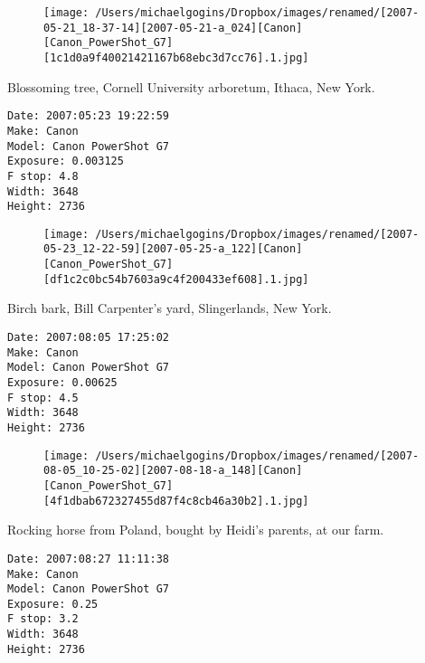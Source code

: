 \documentclass[11pt,letter,DIV=14,paper=landscape]{scrbook}
\begin{document}
\begin{figure}
\texttt{[image: /Users/michaelgogins/Dropbox/images/renamed/[2007-05-21\_18-37-14][2007-05-21-a\_024][Canon][Canon\_PowerShot\_G7][1c1d0a9f40021421167b68ebc3d7cc76].1.jpg]}
\end{figure}
    
\clearpage
\noindent Blossoming tree, Cornell University arboretum, Ithaca, New York.
\noindent
\begin{lstlisting}
Date: 2007:05:23 19:22:59
Make: Canon
Model: Canon PowerShot G7
Exposure: 0.003125
F stop: 4.8
Width: 3648
Height: 2736
\end{lstlisting}
\clearpage

\begin{figure}
\texttt{[image: /Users/michaelgogins/Dropbox/images/renamed/[2007-05-23\_12-22-59][2007-05-25-a\_122][Canon][Canon\_PowerShot\_G7][df1c2c0bc54b7603a9c4f200433ef608].1.jpg]}
\end{figure}
    
\clearpage
\noindent Birch bark, Bill Carpenter's yard, Slingerlands, New York.
\noindent
\begin{lstlisting}
Date: 2007:08:05 17:25:02
Make: Canon
Model: Canon PowerShot G7
Exposure: 0.00625
F stop: 4.5
Width: 3648
Height: 2736
\end{lstlisting}
\clearpage

\begin{figure}
\texttt{[image: /Users/michaelgogins/Dropbox/images/renamed/[2007-08-05\_10-25-02][2007-08-18-a\_148][Canon][Canon\_PowerShot\_G7][4f1dbab672327455d87f4c8cb46a30b2].1.jpg]}
\end{figure}
    
\clearpage
\noindent Rocking horse from Poland, bought by Heidi's parents, at our farm.
\noindent
\begin{lstlisting}
Date: 2007:08:27 11:11:38
Make: Canon
Model: Canon PowerShot G7
Exposure: 0.25
F stop: 3.2
Width: 3648
Height: 2736
\end{lstlisting}
\clearpage
\end{document}

